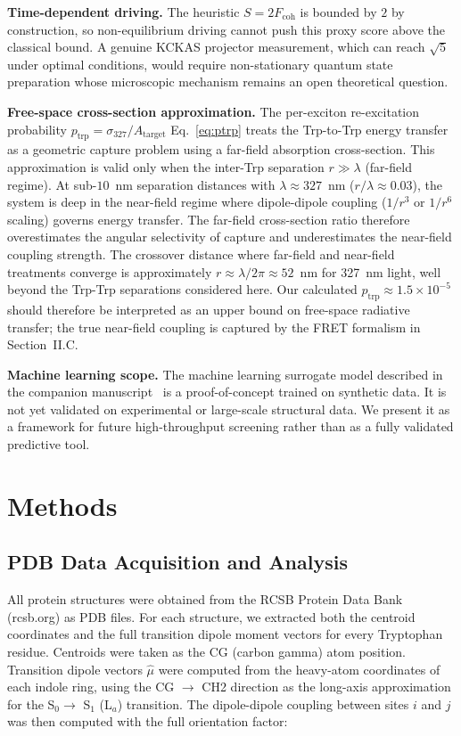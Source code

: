 \documentclass[aps,pre,twocolumn,showpacs,superscriptaddress]{revtex4-2}
\begin{document}
\textbf{Time-dependent driving.} The heuristic $S = 2F_{\mathrm{coh}}$ is bounded by $2$ by construction, so non-equilibrium driving cannot push this proxy score above the classical bound. A genuine KCKAS projector measurement, which can reach $\sqrt{5}$ under optimal conditions, would require non-stationary quantum state preparation whose microscopic mechanism remains an open theoretical question.



\textbf{Free-space cross-section approximation.} The per-exciton re-excitation probability $p_{\mathrm{trp}} = \sigma_{327} / A_{\mathrm{target}}$ Eq.~\eqref{eq:ptrp} treats the Trp-to-Trp energy transfer as a geometric capture problem using a far-field absorption cross-section. This approximation is valid only when the inter-Trp separation $r \gg \lambda$ (far-field regime). At sub-$10$~nm separation distances with $\lambda \approx 327$~nm ($r/\lambda \approx 0.03$), the system is deep in the near-field regime where dipole-dipole coupling ($1/r^3$ or $1/r^6$ scaling) governs energy transfer. The far-field cross-section ratio therefore overestimates the angular selectivity of capture and underestimates the near-field coupling strength. The crossover distance where far-field and near-field treatments converge is approximately $r \approx \lambda/2\pi \approx 52$~nm for 327~nm light, well beyond the Trp-Trp separations considered here. Our calculated $p_{\mathrm{trp}} \approx 1.5\times10^{-5}$ should therefore be interpreted as an upper bound on free-space radiative transfer; the true near-field coupling is captured by the FRET formalism in Section~II.C.

\textbf{Machine learning scope.} The machine learning surrogate model described in the companion manuscript~\cite{MLCompanion2026} is a proof-of-concept trained on synthetic data. It is not yet validated on experimental or large-scale structural data. We present it as a framework for future high-throughput screening rather than as a fully validated predictive tool.

\section{Methods}

\subsection{PDB Data Acquisition and Analysis}

All protein structures were obtained from the RCSB Protein Data Bank (rcsb.org) as PDB files. For each structure, we extracted both the centroid coordinates and the full transition dipole moment vectors for every Tryptophan residue. Centroids were taken as the CG (carbon gamma) atom position. Transition dipole vectors $\hat{\mu}$ were computed from the heavy-atom coordinates of each indole ring, using the CG $\to$ CH2 direction as the long-axis approximation for the S$_0 \to$ S$_1$ (L$_a$) transition. The dipole-dipole coupling between sites $i$ and $j$ was then computed with the full orientation factor:
\end{document}
